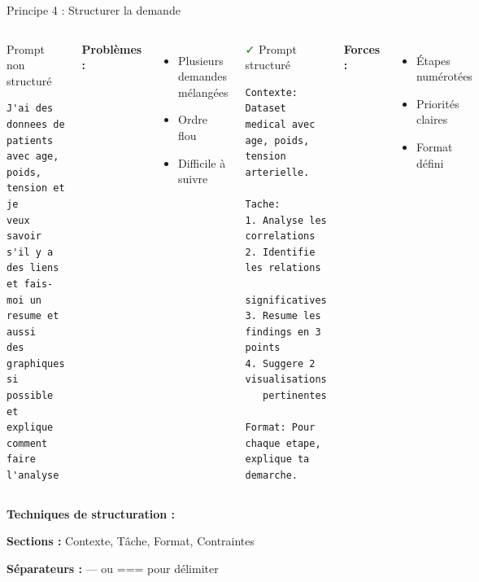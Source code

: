 \begin{frame}[fragile]{Principe 4 : Structurer la demande}
\begin{columns}
\begin{alertblock}{\textcolor{red}{\faTimes} Prompt non structuré}
\begin{lstlisting}[basicstyle=\ttfamily\tiny]
J'ai des donnees de patients 
avec age, poids, tension et je 
veux savoir s'il y a des liens 
et fais-moi un resume et aussi 
des graphiques si possible et 
explique comment faire l'analyse
\end{lstlisting}
\end{alertblock}

{\footnotesize
    \textbf{Problèmes :}
    \begin{itemize}
        \item Plusieurs demandes mélangées
        \item Ordre flou
        \item Difficile à suivre
    \end{itemize}
}

\begin{exampleblock}{\textcolor{green}{\faCheck} Prompt structuré}
\begin{lstlisting}[basicstyle=\ttfamily\tiny]
Contexte: Dataset medical avec 
age, poids, tension arterielle.

Tache:
1. Analyse les correlations
2. Identifie les relations 
   significatives
3. Resume les findings en 3 points
4. Suggere 2 visualisations 
   pertinentes

Format: Pour chaque etape, 
explique ta demarche.
\end{lstlisting}
\end{exampleblock}

{\footnotesize

    \textbf{Forces :}
    \begin{itemize}
        \item Étapes numérotées
        \item Priorités claires
        \item Format défini
    \end{itemize}
}

\end{columns}

\vspace{0.3cm}

{\footnotesize

    \textbf{Techniques de structuration :}

    \textbf{Sections :} Contexte,  Tâche,  Format,  Contraintes

    \textbf{Séparateurs :} --- ou === pour délimiter
}
\end{frame}

